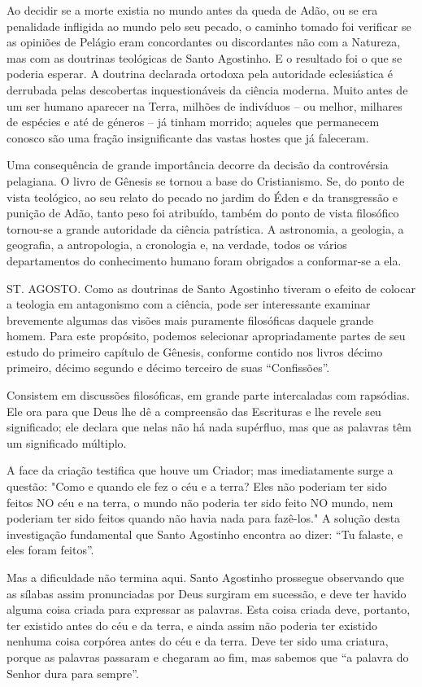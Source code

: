 \documentclass[11pt,a5paper,twoside,openany]{book}
\begin{document}
Ao decidir se a morte existia no mundo antes da queda de Adão, ou se era penalidade infligida ao mundo pelo seu pecado, o caminho tomado foi verificar se as opiniões de Pelágio eram concordantes ou discordantes não com a Natureza, mas com as doutrinas teológicas de Santo Agostinho. E o resultado foi o que se poderia esperar. A doutrina declarada ortodoxa pela autoridade eclesiástica é derrubada pelas descobertas inquestionáveis ​​da ciência moderna. Muito antes de um ser humano aparecer na Terra, milhões de indivíduos – ou melhor, milhares de espécies e até de géneros – já tinham morrido; aqueles que permanecem conosco são uma fração insignificante das vastas hostes que já faleceram.

Uma consequência de grande importância decorre da decisão da controvérsia pelagiana. O livro de Gênesis se tornou a base do Cristianismo. Se, do ponto de vista teológico, ao seu relato do pecado no jardim do Éden e da transgressão e punição de Adão, tanto peso foi atribuído, também do ponto de vista filosófico tornou-se a grande autoridade da ciência patrística. A astronomia, a geologia, a geografia, a antropologia, a cronologia e, na verdade, todos os vários departamentos do conhecimento humano foram obrigados a conformar-se a ela.

ST. AGOSTO. Como as doutrinas de Santo Agostinho tiveram o efeito de colocar a teologia em antagonismo com a ciência, pode ser interessante examinar brevemente algumas das visões mais puramente filosóficas daquele grande homem. Para este propósito, podemos selecionar apropriadamente partes de seu estudo do primeiro capítulo de Gênesis, conforme contido nos livros décimo primeiro, décimo segundo e décimo terceiro de suas “Confissões”.

Consistem em discussões filosóficas, em grande parte intercaladas com rapsódias. Ele ora para que Deus lhe dê a compreensão das Escrituras e lhe revele seu significado; ele declara que nelas não há nada supérfluo, mas que as palavras têm um significado múltiplo.

A face da criação testifica que houve um Criador; mas imediatamente surge a questão: "Como e quando ele fez o céu e a terra? Eles não poderiam ter sido feitos NO céu e na terra, o mundo não poderia ter sido feito NO mundo, nem poderiam ter sido feitos quando não havia nada para fazê-los." A solução desta investigação fundamental que Santo Agostinho encontra ao dizer: “Tu falaste, e eles foram feitos”.

Mas a dificuldade não termina aqui. Santo Agostinho prossegue observando que as sílabas assim pronunciadas por Deus surgiram em sucessão, e deve ter havido alguma coisa criada para expressar as palavras. Esta coisa criada deve, portanto, ter existido antes do céu e da terra, e ainda assim não poderia ter existido nenhuma coisa corpórea antes do céu e da terra. Deve ter sido uma criatura, porque as palavras passaram e chegaram ao fim, mas sabemos que “a palavra do Senhor dura para sempre”.
\end{document}
